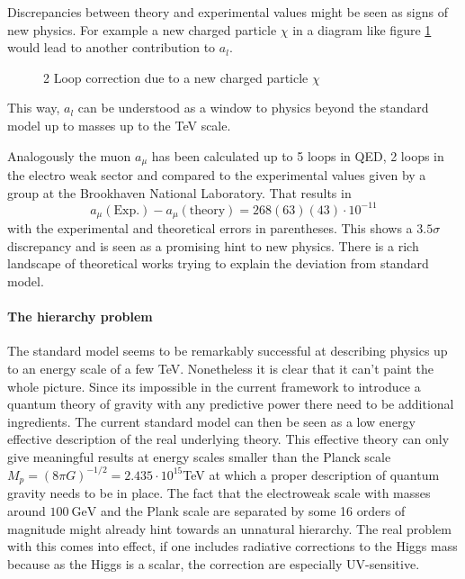 Discrepancies between theory and experimental values might be seen as signs of new physics. For example a new charged particle $\chi$  in a diagram like figure \ref{fg:Mu2BSMCorrection} would lead to another contribution to $a_l$.
\begin{figure}[H]
\centering
{}
\caption{2 Loop correction due to a new charged particle $\chi$}
\label{fg:Mu2BSMCorrection}
\end{figure}
This way, $a_l$ can be understood as a window to physics beyond the standard model up to masses up to the TeV scale.

Analogously the muon $a_\mu$ has been calculated up to 5 loops in QED, 2 loops in the electro weak sector and compared to the experimental values given by a group at the Brookhaven National Laboratory\cite{PhysRevD.73.072003}. That results in
\begin{equation}
a_\mu(\text{Exp.})-a_\mu(\text{theory})= 268(63)(43)\cdot10^{-11}
\end{equation}
with the experimental and theoretical errors in parentheses. This shows a $3.5\sigma$ discrepancy and is seen as a promising hint to new physics. There is a rich landscape of theoretical works trying to explain the deviation from standard model.

\paragraph{The hierarchy problem}
The standard model seems to be remarkably successful at describing physics up to an energy scale of a few TeV. Nonetheless it is clear that it can't paint the whole picture. Since its impossible in the current framework to introduce a quantum theory of gravity with any predictive power there need to be additional ingredients. The current standard model can then be seen as a low energy effective description of the real underlying theory. This effective theory can only give meaningful results at energy scales smaller than the Planck scale $M_p=(8\pi G)^{-1/2}=2.435\cdot 10^{15}$TeV at which a proper description of quantum gravity needs to be in place. The fact that the electroweak scale with masses around $\SI{100}{\giga \eV}$ and the Plank scale are separated by some 16 orders of magnitude might already hint towards an unnatural hierarchy. The real problem with this comes into effect, if one includes radiative corrections to the Higgs mass because as the Higgs is a scalar, the correction are especially UV-sensitive. 

